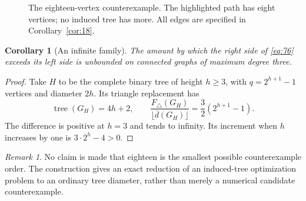 \documentclass[11pt,a4paper]{article}
\newtheorem{corollary}[theorem]{Corollary}
\theoremstyle{remark}
\newtheorem{remark}[theorem]{Remark}
\newcommand{\tree}{\operatorname{tree}}
\begin{document}
\begin{figure}[htbp]
\centering
{}
\caption{The eighteen-vertex counterexample. The highlighted path has
eight vertices; no induced tree has more. All edges are specified in
Corollary~\ref{cor:18}.}\label{fig:counter}
\end{figure}

\begin{corollary}[An infinite family]\label{cor:infinite}
The amount by which the right side of \eqref{eq:76} exceeds its left side
is unbounded on connected graphs of maximum degree three.
\end{corollary}
\begin{proof}
Take $H$ to be the complete binary tree of height $h\ge3$, with
$q=2^{h+1}-1$ vertices and diameter $2h$. Its triangle replacement has
\[
\tree(G_H)=4h+2,\qquad
\frac{F_\triangle(G_H)}{\lfloor\overline d(G_H)\rfloor}
=\frac32(2^{h+1}-1).
\]
The difference is positive at $h=3$ and tends to infinity. Its increment
when $h$ increases by one is $3\cdot2^h-4>0$.
\end{proof}

\begin{remark}
No claim is made that eighteen is the smallest possible counterexample
order. The construction gives an exact reduction of an induced-tree
optimization problem to an ordinary tree diameter, rather than merely
a numerical candidate counterexample.
\end{remark}

\end{document}
